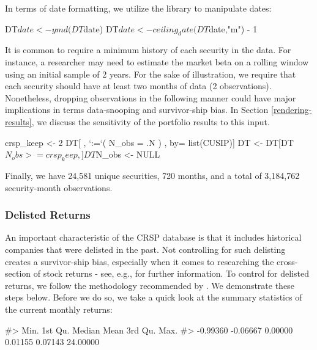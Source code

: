In terms of date formatting, we utilize the  library to
manipulate dates:

\begin{Schunk}
\begin{Sinput}
DT$date <- ymd(DT$date)
DT$date <- ceiling_date(DT$date,"m") - 1
\end{Sinput}
\end{Schunk}
It is common to require a minimum history of each security in the data.
For instance, a researcher may need to estimate the market beta on a
rolling window using an initial sample of 2 years. For the sake of
illustration, we require that each security should have at least two
months of data (2 observations). Nonetheless, dropping
observations in the following manner could have major implications in
terms data-snooping and survivor-ship bias. In Section \ref{rendering-results}, we discuss the sensitivity
of the portfolio results to this input.
\begin{Schunk}
\begin{Sinput}
crsp_keep <- 2
DT[ , `:=`( N_obs = .N   ) , by= list(CUSIP)]
DT <- DT[DT$N_obs >= crsp_keep,]
DT$N_obs <- NULL
\end{Sinput}
\end{Schunk}
Finally, we have 24,581 unique securities, 720 months, and a total of
3,184,762 security-month observations.

\hypertarget{delisted-returns}{%
\subsubsection{Delisted Returns}\label{delisted-returns}}
An important characteristic of the CRSP database is that it includes
historical companies that were delisted in the past. Not controlling for
such delisting creates a survivor-ship bias, especially when it comes to
researching the cross-section of stock returns - see, e.g., \cite{beaver2007delisting}
for further information. To control for delisted returns, we follow the methodology recommended by \cite{bali2016empirical}. We demonstrate these steps below. Before we do so, we take a quick look at the summary statistics of the current monthly returns:
\begin{Schunk}
\begin{Soutput}
#>     Min.  1st Qu.   Median     Mean  3rd Qu.     Max. 
#> -0.99360 -0.06667  0.00000  0.01155  0.07143 24.00000
\end{Soutput}
\end{Schunk}

